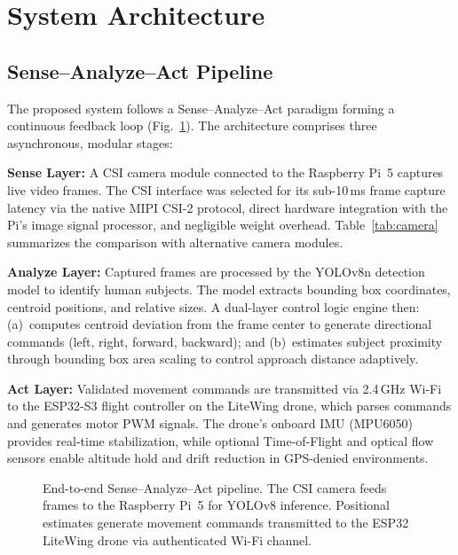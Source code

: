 \documentclass[conference]{IEEEtran}
\begin{document}
\section{System Architecture}
\label{sec:architecture}

\subsection{Sense--Analyze--Act Pipeline}

The proposed system follows a Sense--Analyze--Act paradigm forming a continuous feedback loop (Fig.~\ref{fig:pipeline}). The architecture comprises three asynchronous, modular stages:

\textbf{Sense Layer:} A CSI camera module connected to the Raspberry Pi~5 captures live video frames. The CSI interface was selected for its sub-10\,ms frame capture latency via the native MIPI CSI-2 protocol, direct hardware integration with the Pi's image signal processor, and negligible weight overhead. Table~\ref{tab:camera} summarizes the comparison with alternative camera modules.

\textbf{Analyze Layer:} Captured frames are processed by the YOLOv8n detection model to identify human subjects. The model extracts bounding box coordinates, centroid positions, and relative sizes. A dual-layer control logic engine then: (a)~computes centroid deviation from the frame center to generate directional commands (left, right, forward, backward); and (b)~estimates subject proximity through bounding box area scaling to control approach distance adaptively.

\textbf{Act Layer:} Validated movement commands are transmitted via 2.4\,GHz Wi-Fi to the ESP32-S3 flight controller on the LiteWing drone, which parses commands and generates motor PWM signals. The drone's onboard IMU (MPU6050) provides real-time stabilization, while optional Time-of-Flight and optical flow sensors enable altitude hold and drift reduction in GPS-denied environments.

\begin{figure}[!t]
\centering
\caption{End-to-end Sense--Analyze--Act pipeline. The CSI camera feeds frames to the Raspberry Pi~5 for YOLOv8 inference. Positional estimates generate movement commands transmitted to the ESP32 LiteWing drone via authenticated Wi-Fi channel.}
\label{fig:pipeline}
\end{figure}
\end{document}
